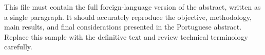 
\begin{abstracttcc}
This file must contain the full foreign-language version of the abstract, written as a single paragraph. It should accurately reproduce the objective, methodology, main results, and final considerations presented in the Portuguese abstract. Replace this sample with the definitive text and review technical terminology carefully.

\end{abstracttcc}
